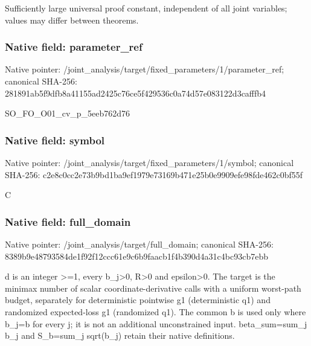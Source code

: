 \documentclass[10pt,a4paper]{article}
\begin{document}
\begingroup\raggedright\sloppy Sufficiently large universal proof constant,\allowbreak{} independent of all joint variables;\allowbreak{} values may differ between theorems.\par\endgroup

\subsubsection{Native field: parameter\_\allowbreak{}ref}
Native pointer: /joint\_\allowbreak{}analysis/target/fixed\_\allowbreak{}parameters/1/parameter\_\allowbreak{}ref; canonical SHA-256: 281891ab5f9dfb8a41155ad2425c76ce5f429536c0a74d57e083122d3cafffb4

\begingroup\raggedright\sloppy SO\_\allowbreak{}FO\_\allowbreak{}O01\_\allowbreak{}cv\_\allowbreak{}p\_\allowbreak{}5eeb762d76\par\endgroup

\subsubsection{Native field: symbol}
Native pointer: /joint\_\allowbreak{}analysis/target/fixed\_\allowbreak{}parameters/1/symbol; canonical SHA-256: c2e8c0cc2e73b9bd1ba9ef1979e73169b471e25b0e9909efe98fde462c0bf55f

\begingroup\raggedright\sloppy C\par\endgroup

\subsubsection{Native field: full\_\allowbreak{}domain}
Native pointer: /joint\_\allowbreak{}analysis/target/full\_\allowbreak{}domain; canonical SHA-256: 8389b9e48793584de1f92f12ccc61e9c6b9faacb1f4b390d4a31c4bc93cb7ebb

\begingroup\raggedright\sloppy d is an integer >=\allowbreak{}1,\allowbreak{} every b\_\allowbreak{}j>0,\allowbreak{} R>0 and epsilon>0. The target is the minimax number of scalar coordinate-derivative calls with a uniform worst-path budget,\allowbreak{} separately for deterministic pointwise g1 (deterministic q1) and randomized expected-loss g1 (randomized q1). The common b is used only where b\_\allowbreak{}j=\allowbreak{}b for every j;\allowbreak{} it is not an additional unconstrained input. beta\_\allowbreak{}sum=\allowbreak{}sum\_\allowbreak{}j b\_\allowbreak{}j and S\_\allowbreak{}b=\allowbreak{}sum\_\allowbreak{}j sqrt(b\_\allowbreak{}j) retain their native definitions.\par\endgroup
\end{document}
